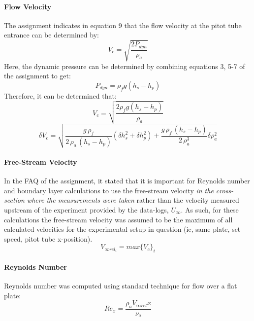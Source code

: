 \documentclass[12pt]{article}
\begin{document}
	\paragraph{Flow Velocity}
	The assignment indicates in equation 9 that the flow velocity at the pitot tube entrance can be determined by:
	$$V_{c} = \sqrt{\frac{2P_{dyn}}{\rho_a}}$$
	Here, the dynamic pressure can be determined by combining equations 3, 5-7 of the assignment to get:
	$$P_{dyn} = \rho_f g (h_s-h_p)$$
	Therefore, it can be determined that:
	\begin{equation}
	V_{c} = \sqrt{\frac{2\rho_f g (h_s-h_p)}{\rho_a}}
	\end{equation}
	\begin{equation}
	\delta V_c = \sqrt{\frac{g\,\rho_f}{2\,\rho_a \,\left(h_{s}-h_{p}\right)}(\delta h_s^2 + \delta h_p^2) + \frac{g\,\rho_f\,\left(h_{s}-h_{p}\right)}{2\,\rho_a ^3}\delta \rho_a^2}
	\end{equation}
	
	\paragraph{Free-Stream Velocity} In the FAQ of the assignment, it stated that it is important for Reynolds number and boundary layer calculations to use the free-stream velocity \textit{in the cross-section where the measurements were taken} rather than the velocity measured upstream of the experiment provided by the data-logs, $U_\infty$.\hfill\break
	As such, for these calculations the free-stream velocity was assumed to be the maximum of all calculated velocities for the experimental setup in question (ie, same plate, set speed, pitot tube x-position).
	\begin{equation}
		V_{\infty rel_i} = max\{V_c\}_i
	\end{equation}
	\paragraph{Reynolds Number} Reynolds number was computed using standard technique for flow over a flat plate:
	\begin{equation}
		Re_x = \frac{\rho_a V_{\infty rel} x}{\nu_a}
	\end{equation}
	
\end{document}
